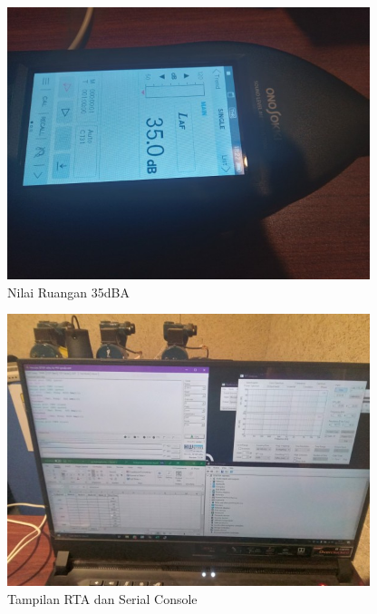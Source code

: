 \documentclass{article} %
\begin{document}
	\begin{figure}[!ht]
		\centering
		\includegraphics[width=300pt]{images/nilai_ruangan}
		\caption{Nilai Ruangan 35dBA}
	\end{figure}

	\begin{figure}[!ht]
		\centering
		\includegraphics[width=300pt]{images/rta_serial}
		\caption{Tampilan RTA dan Serial Console}
	\end{figure}
\end{document}
